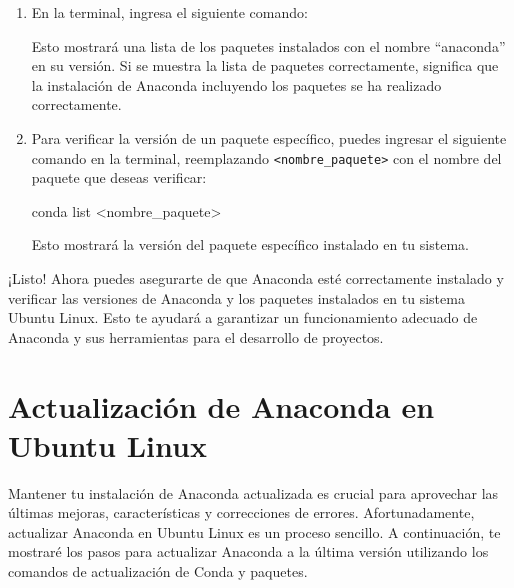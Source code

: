 \documentclass[
  jou,
  floatsintext,
  longtable,
  a4paper,
  nolmodern,
  notxfonts,
  notimes,
  colorlinks=true,linkcolor=blue,citecolor=blue,urlcolor=blue]{apa7}
\newenvironment{Shaded}{\begin{snugshade}}{\end{snugshade}}
\newcommand{\ExtensionTok}[1]{\textcolor[rgb]{0.00,0.23,0.31}{#1}}
\newcommand{\NormalTok}[1]{\textcolor[rgb]{0.00,0.23,0.31}{#1}}
\newcommand{\OperatorTok}[1]{\textcolor[rgb]{0.37,0.37,0.37}{#1}}
\begin{document}
\begin{enumerate}
\def\labelenumi{\arabic{enumi}.}
\item
  En la terminal, ingresa el siguiente comando:

\begin{Shaded}
\end{Shaded}

  Esto mostrará una lista de los paquetes instalados con el nombre
  ``anaconda'' en su versión. Si se muestra la lista de paquetes
  correctamente, significa que la instalación de Anaconda incluyendo los
  paquetes se ha realizado correctamente.
\item
  Para verificar la versión de un paquete específico, puedes ingresar el
  siguiente comando en la terminal, reemplazando
  \texttt{\textless{}nombre\_paquete\textgreater{}} con el nombre del
  paquete que deseas verificar:

\begin{Shaded}
\begin{Highlighting}[]
\ExtensionTok{conda}\NormalTok{ list }\OperatorTok{\textless{}}\NormalTok{nombre\_paquete}\OperatorTok{\textgreater{}}
\end{Highlighting}
\end{Shaded}

  Esto mostrará la versión del paquete específico instalado en tu
  sistema.
\end{enumerate}

¡Listo! Ahora puedes asegurarte de que Anaconda esté correctamente
instalado y verificar las versiones de Anaconda y los paquetes
instalados en tu sistema Ubuntu Linux. Esto te ayudará a garantizar un
funcionamiento adecuado de Anaconda y sus herramientas para el
desarrollo de proyectos.

\section{Actualización de Anaconda en Ubuntu
Linux}\label{actualizaciuxf3n-de-anaconda-en-ubuntu-linux}

Mantener tu instalación de Anaconda actualizada es crucial para
aprovechar las últimas mejoras, características y correcciones de
errores. Afortunadamente, actualizar Anaconda en Ubuntu Linux es un
proceso sencillo. A continuación, te mostraré los pasos para actualizar
Anaconda a la última versión utilizando los comandos de actualización de
Conda y paquetes.
\end{document}

